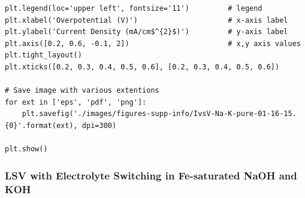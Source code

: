 \documentclass[journal=jpccck,manuscript=suppinfo,email=true]{achemso}
\begin{document}
\begin{verbatim}
plt.legend(loc='upper left', fontsize='11')         # legend
plt.xlabel('Overpotential (V)')                     # x-axis label
plt.ylabel('Current Density (mA/cm$^{2}$)')         # y-axis label
plt.axis([0.2, 0.6, -0.1, 2])                       # x,y axis values
plt.tight_layout()
plt.xticks([0.2, 0.3, 0.4, 0.5, 0.6], [0.2, 0.3, 0.4, 0.5, 0.6])

# Save image with various extentions
for ext in ['eps', 'pdf', 'png']:
    plt.savefig('./images/figures-supp-info/IvsV-Na-K-pure-01-16-15.{0}'.format(ext), dpi=300)

plt.show()
\end{verbatim}

\subsubsection{LSV with Electrolyte Switching in Fe-saturated NaOH and KOH}
\label{sec-6-1-4}
\end{document}
